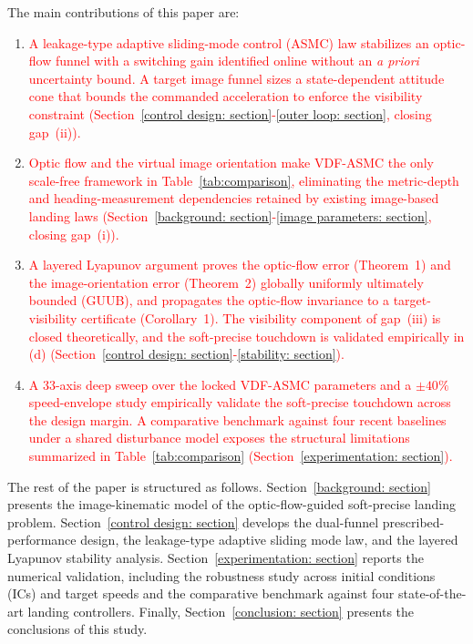 \documentclass{IEEEtaes}
\newcommand{\new}[1]{\textcolor{red}{#1}}
\begin{document}
The main contributions of this paper are:
\begin{enumerate}
    \item[(a)] \new{A leakage-type adaptive sliding-mode control (ASMC) law stabilizes an optic-flow funnel with a switching gain identified online without an \emph{a priori} uncertainty bound. A target image funnel sizes a state-dependent attitude cone that bounds the commanded acceleration to enforce the visibility constraint (Section~\ref{control design: section}-\ref{outer loop: section}, closing gap~(ii)).}
    \item[(b)] \new{Optic flow and the virtual image orientation make VDF-ASMC the only scale-free framework in Table~\ref{tab:comparison}, eliminating the metric-depth and heading-measurement dependencies retained by existing image-based landing laws (Section~\ref{background: section}-\ref{image parameters: section}, closing gap~(i)).}
    \item[(c)] \new{A layered Lyapunov argument proves the optic-flow error (Theorem~1) and the image-orientation error (Theorem~2) globally uniformly ultimately bounded (GUUB), and propagates the optic-flow invariance to a target-visibility certificate (Corollary~1). The visibility component of gap~(iii) is closed theoretically, and the soft-precise touchdown is validated empirically in (d) (Section~\ref{control design: section}-\ref{stability: section}).}
    \item[(d)] \new{A 33-axis deep sweep over the locked VDF-ASMC parameters and a $\pm 40\%$ speed-envelope study empirically validate the soft-precise touchdown across the design margin. A comparative benchmark against four recent baselines~\cite{lin2022,zhang2026,chen2025,cho2022} under a shared disturbance model exposes the structural limitations summarized in Table~\ref{tab:comparison} (Section~\ref{experimentation: section}).}
\end{enumerate}

The rest of the paper is structured as follows. Section~\ref{background: section} presents the image-kinematic model of the optic-flow-guided soft-precise landing problem. Section~\ref{control design: section} develops the dual-funnel prescribed-performance design, the leakage-type adaptive sliding mode law, and the layered Lyapunov stability analysis. Section~\ref{experimentation: section} reports the numerical validation, including the robustness study across initial conditions (ICs) and target speeds and the comparative benchmark against four state-of-the-art landing controllers. Finally, Section~\ref{conclusion: section} presents the conclusions of this study.
\end{document}
